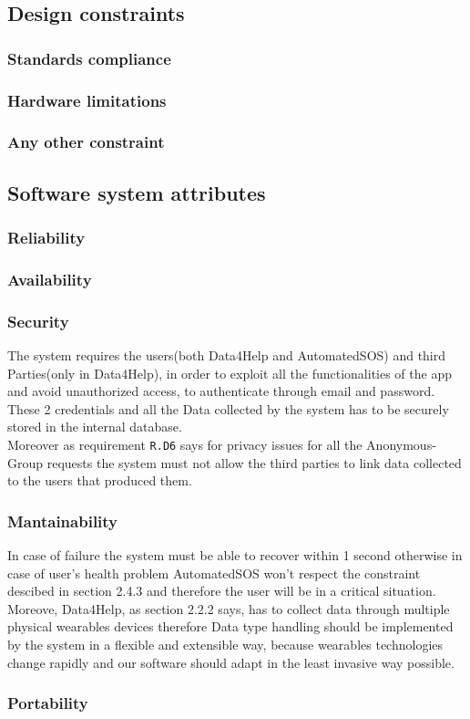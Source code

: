   \subsection{Design constraints}
    \subsubsection{Standards compliance}
    \subsubsection{Hardware limitations}
    \subsubsection{Any other constraint}
  \subsection{Software system attributes}
    \subsubsection{Reliability}
    \subsubsection{Availability}
    \subsubsection{Security}
The system requires the users(both Data4Help and AutomatedSOS) and third Parties(only in Data4Help), in order to exploit all the functionalities of the app and avoid unauthorized access, to authenticate through email and password.\\ These 2 credentials and all the Data collected by the system has to be securely stored in the internal database.\\ Moreover as  requirement \texttt{R.D6} says for privacy issues for all the Anonymous-Group requests the system must not allow the third parties to link data collected to the users that produced them.
    \subsubsection{Mantainability}
In case of failure the system must be able to recover within 1 second otherwise in case of user's health problem AutomatedSOS won't respect the constraint descibed in section 2.4.3 and therefore the user will be in a critical situation.\\
Moreove, Data4Help, as section 2.2.2 says, has to collect data through multiple physical wearables devices therefore 
Data type handling should be implemented by the system in a flexible and extensible way, because wearables technologies change rapidly and our software should adapt in the least invasive way possible.

    \subsubsection{Portability}











